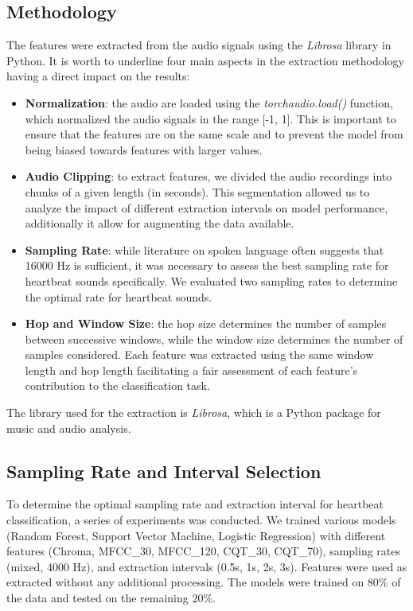 \subsection{Methodology}
The features were extracted from the audio signals using the \textit{Librosa} library in Python. It is worth to underline four main aspects in the extraction
methodology having a direct impact on the results:
\begin{itemize}[leftmargin=*]
    \item \textbf{Normalization}: the audio are loaded using the \textit{torchaudio.load()} function, which normalized the audio signals in the range [-1, 1]. This is important to ensure that the features are on the same scale and to prevent the model from being biased towards features with larger values.
    \item \textbf{Audio Clipping}: to extract features, we divided the audio recordings into chunks of a given length (in seconds). This segmentation allowed us to analyze the impact of different extraction intervals on model performance, additionally it allow for augmenting the data available. 
    \item \textbf{Sampling Rate}: while literature on spoken language often suggests that 16000 Hz is sufficient, it was necessary to assess the best sampling rate for heartbeat sounds specifically. We evaluated two sampling rates to determine the optimal rate for heartbeat sounds. 
    \item \textbf{Hop and Window Size}: the hop size determines the number of samples between successive windows, while the window size determines the number of samples considered. Each feature was extracted using the same window length and hop length facilitating a fair assessment of each feature's contribution to the classification task. 
\end{itemize}
The library used for the extraction is \textit{Librosa}, which is a Python package for music and audio analysis. 

\subsection{Sampling Rate and Interval Selection} \label{sec:sr_extraction_interval}
To determine the optimal sampling rate and extraction interval for heartbeat classification, a series of experiments was conducted.
We trained various models (Random Forest, Support Vector Machine, Logistic Regression) with different features (Chroma, MFCC\_30, MFCC\_120, CQT\_30, CQT\_70),
sampling rates (mixed, 4000 Hz), and extraction intervals (0.5s, 1s, 2s, 3s). Features were used as extracted without any additional processing. 
The models were trained on 80\% of the data and tested on the remaining 20\%.

